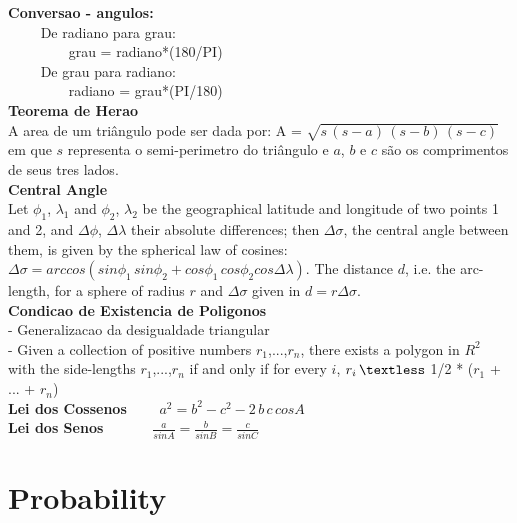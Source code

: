 \documentclass[10pt, twocolumn]{article}
\begin{document}
\begin{flushleft}
\textbf{Conversao - angulos:}\\
$\qquad$ De radiano para grau:\\
$\qquad \qquad$ grau = radiano*(180/PI)\\
$\qquad$ De grau para radiano:\\
$\qquad \qquad$ radiano = grau*(PI/180)\\[0.5cm]

\textbf{Teorema de Herao}\\
A area de um triângulo pode ser dada por: A = $\sqrt{s\,(s-a)\,(s-b)\,(s-c)}$ em que $s$ representa o semi-perimetro do triângulo e $a$, $b$ e $c$ são os comprimentos de seus tres lados.\\[0.5cm]

\textbf{Central Angle}\\
Let $\phi_1$, $\lambda_1$ and $\phi_2$, $\lambda_2$ be the geographical latitude and longitude of two points 1 and 2, and $\Delta\phi$, $\Delta\lambda$ their absolute differences; then $\Delta\sigma$, the central angle between them, is given by the spherical law of cosines: $\Delta\sigma = arccos(sin\phi_1 \, sin\phi_2 + cos\phi_1 \, cos\phi_2 cos\Delta\lambda).$ The distance $d$, i.e. the arc-length, for a sphere of radius $r$ and $\Delta\sigma$ given in $d = r\Delta\sigma$.\\[0.5cm]

\textbf{Condicao de Existencia de Poligonos}\\
- Generalizacao da desigualdade triangular\\
- Given a collection of positive numbers $r_1$,...,$r_n$, there exists a polygon in $R^{2}$ with the side-lengths $r_1$,...,$r_n$ if and only if for every $i$, $r_i \, \textless $  1/2 * ($r_1$ + ... + $r_n$)\\[0.5cm]

\textbf{Lei dos Cossenos} $\qquad a^{2} = b^{2} - c^{2} - 2\,b\,c\,cosA$\\
\textbf{Lei dos Senos} $\, \quad \qquad \frac{a}{sin A} = \frac{b}{sin B} = \frac{c}{sin C}$




\section{Probability}


\end{flushleft}
\end{document}
